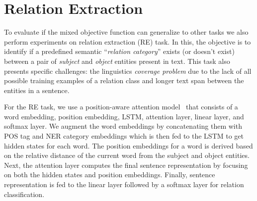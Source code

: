 \documentclass[letterpaper]{article}
\newcommand{\citep}{\cite}
\begin{document}
\section{Relation Extraction}    \label{sec:RE}
To evaluate if the mixed objective function can generalize to other tasks we also perform experiments on relation extraction (RE) task. In this, the objective is to identify if a predefined semantic ``\emph{relation category}'' exists (or doesn't exist) between a pair of \emph{subject} and \emph{object} entities present in text. This task also presents specific challenges: the linguistics \emph{coverage problem} due to the lack of all possible training examples of a relation class and longer text span between the entities in a sentence.

For the RE task, we use a position-aware attention model~\citep{yuhao2017slot} that consists of a word embedding, position embedding, LSTM, attention layer, linear layer, and softmax layer. We augment the word embeddings by concatenating them with POS tag and NER category embeddings which is then fed to the LSTM to get hidden states for each word. The position embeddings for a word is derived based on the relative distance of the current word from the subject and object entities. Next, the attention layer computes the final sentence representation by focusing on both the hidden states and position embeddings. Finally, sentence representation is fed to the linear layer followed by a softmax layer for relation classification.
\end{document}
